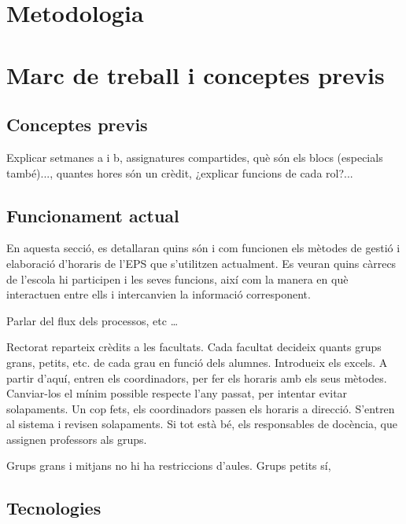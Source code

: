 \documentclass[a4paper,12pt]{ThesisStyle}
\begin{document}
\chapter{Metodologia}
\label{cap:metodologia}



\chapter{Marc de treball i conceptes previs}  %
\label{cap:marcdetreball}

\section{Conceptes previs}
\label{sec:conceptes_previs}
Explicar setmanes a i b, assignatures compartides, què són els blocs (especials també)..., quantes hores
són un crèdit, ¿explicar funcions de cada rol?... 

\section{Funcionament actual}
\label{sec:funcionament_actual}

En aquesta secció, es detallaran quins són i com funcionen els mètodes de gestió i elaboració d'horaris de l'EPS que s'utilitzen actualment. Es veuran quins càrrecs de l'escola hi participen i les seves funcions, així com la manera en què interactuen entre ells i intercanvien la informació corresponent.

Parlar del flux dels processos, etc \ldots

Rectorat reparteix crèdits a les facultats. Cada facultat decideix quants grups grans, petits, etc. de cada grau en funció dels alumnes. Introdueix els excels.
A partir d'aquí, entren els coordinadors, per fer els horaris amb els seus mètodes. Canviar-los el mínim possible respecte l'any passat, per intentar evitar
solapaments. Un cop fets, els coordinadors passen els horaris a direcció. S'entren al sistema i revisen solapaments. Si tot està bé, els responsables de docència,
que assignen professors als grups. 

Grups grans i mitjans no hi ha restriccions d'aules. Grups petits sí,

\section{Tecnologies}
\label{sec:tecnologies}
\end{document}
